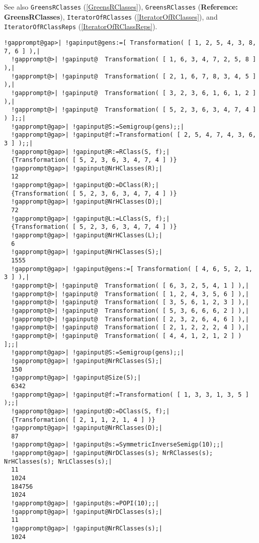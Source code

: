 \documentclass[a4paper,11pt]{report}
\begin{document}
{{{ See also \texttt{GreensRClasses} (\ref{GreensRClasses}), \texttt{GreensRClasses} (\textbf{Reference: GreensRClasses}), \texttt{IteratorOfRClasses} (\ref{IteratorOfRClasses}), and \texttt{IteratorOfRClassReps} (\ref{IteratorOfRClassReps}). 
\begin{Verbatim}[commandchars=!@|,fontsize=\small,frame=single,label=Example]
  !gapprompt@gap>| !gapinput@gens:=[ Transformation( [ 1, 2, 5, 4, 3, 8, 7, 6 ] ),|
  !gapprompt@>| !gapinput@  Transformation( [ 1, 6, 3, 4, 7, 2, 5, 8 ] ),|
  !gapprompt@>| !gapinput@  Transformation( [ 2, 1, 6, 7, 8, 3, 4, 5 ] ),|
  !gapprompt@>| !gapinput@  Transformation( [ 3, 2, 3, 6, 1, 6, 1, 2 ] ),|
  !gapprompt@>| !gapinput@  Transformation( [ 5, 2, 3, 6, 3, 4, 7, 4 ] ) ];;|
  !gapprompt@gap>| !gapinput@S:=Semigroup(gens);;|
  !gapprompt@gap>| !gapinput@f:=Transformation( [ 2, 5, 4, 7, 4, 3, 6, 3 ] );;|
  !gapprompt@gap>| !gapinput@R:=RClass(S, f);|
  {Transformation( [ 5, 2, 3, 6, 3, 4, 7, 4 ] )}
  !gapprompt@gap>| !gapinput@NrHClasses(R);|
  12
  !gapprompt@gap>| !gapinput@D:=DClass(R);|
  {Transformation( [ 5, 2, 3, 6, 3, 4, 7, 4 ] )}
  !gapprompt@gap>| !gapinput@NrHClasses(D);|
  72
  !gapprompt@gap>| !gapinput@L:=LClass(S, f);|
  {Transformation( [ 5, 2, 3, 6, 3, 4, 7, 4 ] )}
  !gapprompt@gap>| !gapinput@NrHClasses(L);|
  6 
  !gapprompt@gap>| !gapinput@NrHClasses(S);|
  1555
  !gapprompt@gap>| !gapinput@gens:=[ Transformation( [ 4, 6, 5, 2, 1, 3 ] ),|
  !gapprompt@>| !gapinput@  Transformation( [ 6, 3, 2, 5, 4, 1 ] ),|
  !gapprompt@>| !gapinput@  Transformation( [ 1, 2, 4, 3, 5, 6 ] ),|
  !gapprompt@>| !gapinput@  Transformation( [ 3, 5, 6, 1, 2, 3 ] ),|
  !gapprompt@>| !gapinput@  Transformation( [ 5, 3, 6, 6, 6, 2 ] ),|
  !gapprompt@>| !gapinput@  Transformation( [ 2, 3, 2, 6, 4, 6 ] ),|
  !gapprompt@>| !gapinput@  Transformation( [ 2, 1, 2, 2, 2, 4 ] ),|
  !gapprompt@>| !gapinput@  Transformation( [ 4, 4, 1, 2, 1, 2 ] ) ];;|
  !gapprompt@gap>| !gapinput@S:=Semigroup(gens);;|
  !gapprompt@gap>| !gapinput@NrRClasses(S);|
  150
  !gapprompt@gap>| !gapinput@Size(S);|
  6342
  !gapprompt@gap>| !gapinput@f:=Transformation( [ 1, 3, 3, 1, 3, 5 ] );;|
  !gapprompt@gap>| !gapinput@D:=DClass(S, f);|
  {Transformation( [ 2, 1, 1, 2, 1, 4 ] )}
  !gapprompt@gap>| !gapinput@NrRClasses(D);|
  87
  !gapprompt@gap>| !gapinput@s:=SymmetricInverseSemigp(10);;|
  !gapprompt@gap>| !gapinput@NrDClasses(s); NrRClasses(s); NrHClasses(s); NrLClasses(s);|
  11
  1024
  184756
  1024
  !gapprompt@gap>| !gapinput@s:=POPI(10);;|
  !gapprompt@gap>| !gapinput@NrDClasses(s);|
  11
  !gapprompt@gap>| !gapinput@NrRClasses(s);|
  1024
\end{Verbatim}
 }

}}
\end{document}
